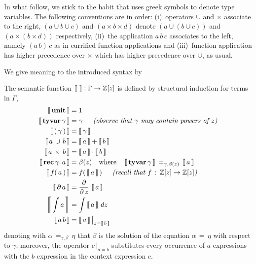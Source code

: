 In what follow, we stick to the habit that uses greek symbols to denote type
variables. The following conventions are in order: (i)~operators $\cup$ and
$\times$ associate to the right, $(a \cup b \cup c)$ and $(a \times b \times
d)$ denote $\left(a \cup (b \cup c)\right)$ and $(a \times (b \times d))$
respectively, (ii)~the application $a\,b\,c$ associates to the left, namely
$(a\,b)\,c$ as in currified function applications and (iii)~function
application has higher precedence over $\times$ which has higher precedence
over $\cup$, as usual.

We give meaning to the introduced syntax by
\begin{definition}[Semantic]
The semantic function $\left\llbracket\,\,\right\rrbracket: \Gamma \rightarrow
\mathbb{Z}[z]$ is defined by structural induction for terms in $\Gamma$,
\begin{displaymath}
\begin{split}
    \semantic{\tyunit} &= 1 \\
    \semantic{\tyvar{\gamma}} &= \gamma\indent\textit{(observe that $\gamma$ may contain powers of $z$)} \\
    \semantic{\typarens{\gamma}} &= \semantic{\gamma}\\
    \semantic{\tydu{a}{b}} &= \semantic{a} + \semantic{b} \\
    \semantic{\tycp{a}{b}} &= \semantic{a}\cdot\semantic{b} \\
    \semantic{\tyrec{\gamma}{a}} &= \beta(z)  \quad\text{where}\quad
        \semantic{\tyvar{\gamma}}\,=_{\gamma,\beta(z)}\,\semantic{a}\\
    \semantic{f(\,a\,)} &= f(\,\semantic{a}\,)\indent\textit{(recall that $f\,:\,\mathbb{Z}[z]\rightarrow\mathbb{Z}[z]$)}\\
    \semantic{\partial\,a} &= \frac{\partial}{\partial\,z}\,\semantic{a}\\
    \semantic{\int{a}} &= \int{\semantic{a}\,dz}\\
    \semantic{a\,b} &= \semantic{a}\big|_{z=\semantic{b}}\\
\end{split}
\end{displaymath}
denoting with $\alpha\,=_{\gamma,\beta}\,\eta$ that $\beta$ is the solution of
the equation $\alpha\,=\,\eta$ with respect to $\gamma$; moreover, the operator
$c\,\big|_{a=b}$ substitutes every occurrence of $a$ expressions with the $b$
expression in the context expression $c$.
\end{definition}

